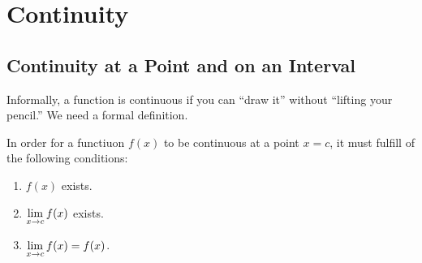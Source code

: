 \chapter{Continuity}
\section{Continuity at a Point and on an Interval}

Informally, a function is continuous if you can “draw it” without “lifting your pencil.” We need a formal definition. \cite{mooc}

\begin{definition}
    In order for a functiuon $f(x)$ to be continuous at a point $x=c$, it must fulfill  of the following conditions:
    \begin{enumerate}
        \item $f(x)$ exists.
        \item $\displaystyle\lim\limits_{x\to c}f(x)$ exists.
        \item $\displaystyle\lim\limits_{x\to c}f(x) =f(x)$.
    \end{enumerate}
    \cite{ap}
\end{definition}

